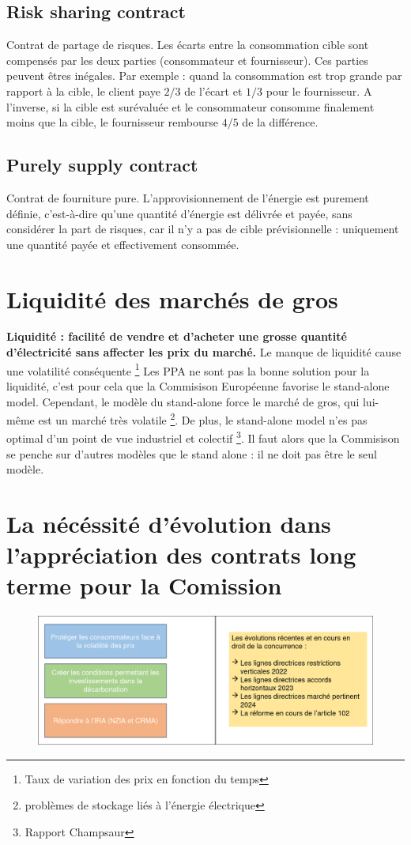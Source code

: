 \subsection{Risk sharing contract}
Contrat de partage de risques. Les écarts entre la consommation cible sont compensés par les deux parties (consommateur et fournisseur). Ces parties peuvent êtres inégales. Par exemple : quand la consommation est trop grande par rapport à la cible, le client paye $2/3$ de l'écart et $1/3$ pour le fournisseur. A l'inverse, si la cible est surévaluée et le consommateur consomme finalement moins que la cible, le fournisseur rembourse $4/5$ de la différence.
\subsection{Purely supply contract}
Contrat de fourniture pure. L'approvisionnement de l'énergie est purement définie, c'est-à-dire qu'une quantité d'énergie est délivrée et payée, sans considérer la part de risques, car il n'y a pas de cible prévisionnelle : uniquement une quantité payée et effectivement consommée.
\newpage
\section{Liquidité des marchés de gros}
\textbf{Liquidité : facilité de vendre et d'acheter une grosse quantité d'électricité sans affecter les prix du marché.} Le manque de liquidité cause une volatilité conséquente \footnote{Taux de variation des prix en fonction du temps} \newline
Les PPA ne sont pas la bonne solution pour la liquidité, c'est pour cela que la Commisison Européenne favorise le stand-alone model. Cependant, le modèle du stand-alone force le marché de gros, qui lui-même est un marché très volatile \footnote{problèmes de stockage liés à l'énergie électrique}. De plus, le stand-alone model n'es pas optimal d'un point de vue industriel et colectif \footnote{Rapport Champsaur}. Il faut alors que la Commisison se penche sur d'autres modèles que le stand alone : il ne doit pas être le seul modèle.
\section{La nécéssité d'évolution dans l'appréciation des contrats long terme pour la Comission}
\begin{figure}[hhbt!]
    \centering
    \includegraphics[scale=0.35]{Pics/evolution_contrat_long_terme.png}
\end{figure}